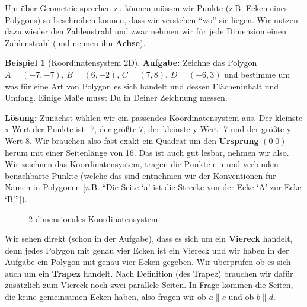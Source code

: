 \documentclass[a4paper]{book}%
\theoremstyle{definition}
\newtheorem{beispiel}{Beispiel}
\begin{document}
Um über Geometrie sprechen zu können müssen wir Punkte (z.B. Ecken eines Polygons) so beschreiben können, dass wir verstehen \enquote{wo} sie liegen. Wir nutzen dazu wieder den Zahlenstrahl und zwar nehmen wir für jede Dimension einen Zahlenstrahl (und nennen ihn \textbf{Achse}).

\begin{beispiel}[Koordinatensystem 2D]
\textbf{Aufgabe:} Zeichne das Polygon $A=(-7,-7)$, $B=(6,-2)$, $C=(7,8)$, $D=(-6,3)$ und bestimme um was für eine Art von Polygon es sich handelt und dessen Flächeninhalt und Umfang. Einige Maße musst Du in Deiner Zeichnung messen.

\textbf{Lösung:} Zunächst wählen wir ein passendes Koordinatensystem aus. Der kleinste x-Wert der Punkte ist -7, der größte 7, der kleinste y-Wert -7 und der größte y-Wert 8. Wir brauchen also fast exakt ein Quadrat um den \textbf{Ursprung} $(0|0)$ herum  mit einer Seitenlänge von 16. Das ist auch gut lesbar, nehmen wir also. Wir zeichnen das Koordinatensystem, tragen die Punkte ein und verbinden benachbarte Punkte (welche das sind entnehmen wir der Konventionen für Namen in Polygonen [z.B. \enquote{Die Seite \enquote{a} ist die Strecke von der Ecke \enquote{A} zur Ecke \enquote{B}.}]).

\begin{figure}[h]
  \centering
  \caption{2-dimensionales Koordinatensystem}\label{fig:koordinatensystem2D}
\end{figure}

Wir sehen direkt (schon in der Aufgabe), dass es sich um ein \textbf{Viereck} handelt, denn jedes Polygon mit genau vier Ecken ist ein Viereck und wir haben in der Aufgabe ein Polygon mit genau vier Ecken gegeben. Wir überprüfen ob es sich auch um ein \textbf{Trapez} handelt. Nach Definition (des Trapez) brauchen wir dafür zusätzlich zum Viereck noch zwei parallele Seiten. In Frage kommen die Seiten, die keine gemeinsamen Ecken haben, also fragen wir ob $a \| c$ und ob $b \| d$.


\end{beispiel}
\end{document}
